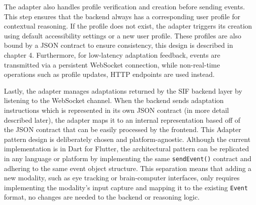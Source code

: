 \documentclass[openany]{book}
\begin{document}
The adapter also handles profile verification and creation before sending events. This step ensures that the backend always has a corresponding user profile for contextual reasoning. If the profile does not exist, the adapter triggers its creation using default accessibility settings or a new user profile. These profiles are also bound by a JSON contract to ensure consistency, this design is described in chapter 4. Furthermore, for low-latency adaptation feedback, events are transmitted via a persistent WebSocket connection, while non-real-time operations such as profile updates, HTTP endpoints are used instead.

Lastly, the adapter manages adaptations returned by the SIF backend layer by listening to the WebSocket channel. When the backend sends adaptation instructions which is represented in its own JSON contract (in more detail described later), the adapter maps it to an internal representation based off of the JSON contract that can be easily processed by the frontend. This Adapter pattern design is deliberately chosen and platform-agnostic. Although the current implementation is in Dart for Flutter, the architectural pattern can be replicated in any language or platform by implementing the same \texttt{sendEvent()} contract and adhering to the same event object structure. This separation means that adding a new modality, such as eye tracking or brain-computer interfaces, only requires implementing the modality’s input capture and mapping it to the existing \texttt{Event} format, no changes are needed to the backend or reasoning logic.

\end{document}
